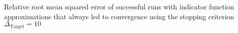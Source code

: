 Relative root mean squared error of successful runs with indicator function approximations that always led to convergence using the stopping criterion $\Delta_{\text{Target}} = 10$